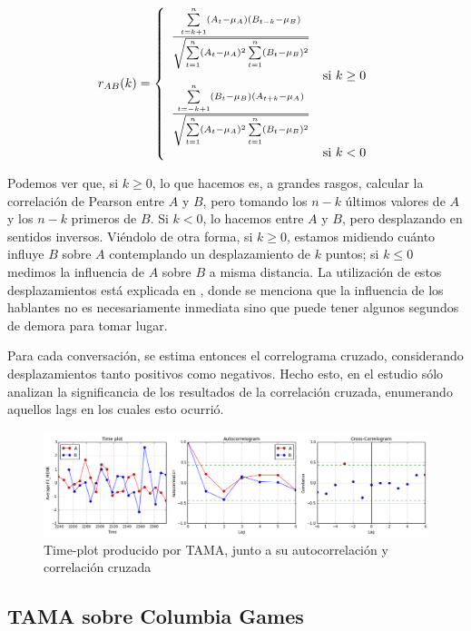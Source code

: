 \begin{equation}
  \label{cross_correlation_definition}
  r_{AB}(k) =
  \left\{
    \begin{array}{ll}
      \frac{\sum\limits_{t=k+1}^n (A_t - \mu_{A}) (B_{t-k} - \mu_{B})}{\sqrt{\sum\limits_{t=1}^n (A_t - \mu_{A})^2\sum\limits_{t=1}^n (B_t - \mu_{B})^2}} \\ & \mbox{si } k \geq 0 \\
      \frac{\sum\limits_{t=-k+1}^n (B_t - \mu_{B}) (A_{t+k} - \mu_{A})}{\sqrt{\sum\limits_{t=1}^n (A_t - \mu_{A})^2\sum\limits_{t=1}^n (B_t - \mu_{B})^2}} \\  & \mbox{si } k < 0
    \end{array}
  \right.
\end{equation}

Podemos ver que, si $k \geq 0$, lo que hacemos es, a grandes rasgos, calcular la correlación de Pearson entre $A$ y $B$, pero tomando los $n-k$ últimos valores de $A$ y los $n-k$ primeros de $B$. Si $k < 0$, lo hacemos entre $A$ y $B$, pero desplazando en sentidos inversos. Viéndolo de otra forma, si $k \geq 0$, estamos midiendo cuánto influye $B$ sobre $A$ contemplando un desplazamiento de $k$ puntos; si $k \leq 0$ medimos la influencia de $A$ sobre $B$ a misma distancia. La utilización de estos desplazamientos está explicada en \cite{gravano2015backward}, donde se menciona que la influencia de los hablantes no es necesariamente inmediata sino que puede tener algunos segundos de demora para tomar lugar. 

Para cada conversación, se estima entonces el correlograma cruzado, considerando desplazamientos tanto positivos como negativos. Hecho esto, en el estudio \cite{KOU2008.2} sólo analizan la significancia de los resultados de la correlación cruzada, enumerando aquellos lags en los cuales esto ocurrió.

\begin{figure}[b]
\centering
\includegraphics[width=\textwidth]{images/time_plot_with_cross_correlation.png}
\caption{Time-plot producido por TAMA, junto a su autocorrelación y correlación cruzada}
\end{figure}


\subsection{TAMA sobre Columbia Games}
\label{sec:tama_modifications}

